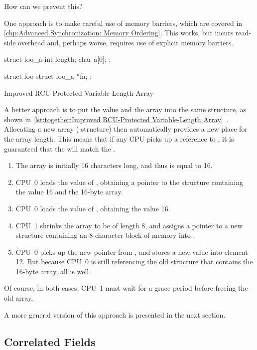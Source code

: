 How can we prevent this?

One approach is to make careful use of memory barriers, which are
covered in \cref{chp:Advanced Synchronization: Memory Ordering}.
This works, but incurs read-side overhead and, perhaps worse, requires
use of explicit memory barriers.

\begin{listing}[tbp]
\begin{VerbatimL}[tabsize=8]
struct foo_a {
	int length;
	char a[0];
};

struct foo {
	struct foo_a *fa;
};
\end{VerbatimL}
\caption{Improved RCU-Protected Variable-Length Array}
\label{lst:together:Improved RCU-Protected Variable-Length Array}
\end{listing}

A better approach is to put the value and the array into the same structure,
as shown in
\cref{lst:together:Improved RCU-Protected Variable-Length Array}~\cite{Arcangeli03}.
Allocating a new array ( structure) then automatically provides
a new place for the array length.
This means that if any CPU picks up a reference to , it is
guaranteed that the  will match the .

\begin{enumerate}
\item	The array is initially 16 characters long, and thus 
	is equal to 16.
\item	CPU~0 loads the value of , obtaining a pointer to
	the structure containing the value 16 and the 16-byte array.
\item	CPU~0 loads the value of , obtaining the value 16.
\item	CPU~1 shrinks the array to be of length 8, and assigns a pointer
	to a new  structure containing an 8-character block
	of memory into .
\item	CPU~0 picks up the new pointer from , and stores a
	new value into element 12.
	But because CPU~0 is still referencing the old 
	structure that contains the 16-byte array, all is well.
\end{enumerate}

Of course, in both cases, CPU~1 must wait for a grace period before
freeing the old array.

A more general version of this approach is presented in the next section.

\subsection{Correlated Fields}
\label{sec:together:Correlated Fields}

